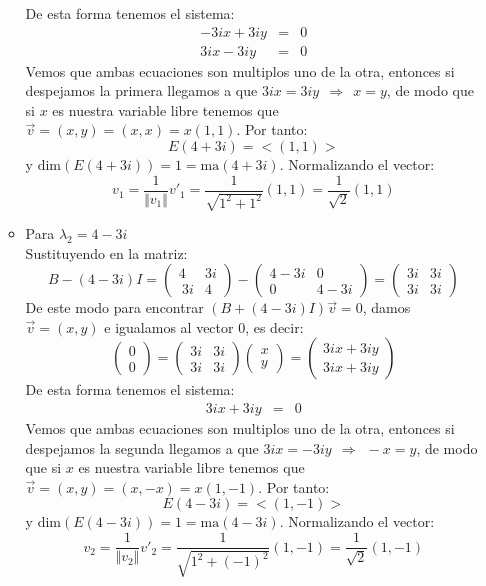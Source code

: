 \begin{itemize}
\begin{itemize}
        De esta forma tenemos el sistema:
        \begin{eqnarray*}
        -3ix+3iy&=&0\\
        3ix-3iy&=&0
        \end{eqnarray*}
        Vemos que ambas ecuaciones son multiplos uno de la otra, entonces si despejamos la primera llegamos a que $3ix=3iy~~\Longrightarrow~~x=y$, de modo que si $x$ es nuestra variable libre tenemos que $\vec{v}=(x,y)=(x,x)=x(1,1)$. Por tanto:
        \[E(4+3i)=<(1,1)>\]
        y $\text{dim}(E(4+3i))=1=\text{ma}(4+3i)$. 
        Normalizando el vector:
        \[v_1=\frac{1}{\Vert v_1\Vert}v'_1=\frac{1}{\sqrt{1^2+1^2}}(1,1)=\frac{1}{\sqrt{2}}(1,1)\]
        
        \item Para $\lambda_2=4-3i$\\
        Sustituyendo en la matriz:
        \[B-(4-3i)I=\begin{pmatrix}4&3i\\ \:3i&4\end{pmatrix}- \begin{pmatrix}4-3i&0\\ 0&4-3i\end{pmatrix}=\begin{pmatrix}3i&3i\\ 3i&3i\end{pmatrix}\]
        De este modo para encontrar $(B+(4-3i)I)\Vec{v}=0$, damos $\vec{v}=(x,y)$ e igualamos al vector 0, es decir:
        \[\begin{pmatrix}0\\0\end{pmatrix}=\begin{pmatrix}3i&3i\\ 3i&3i\end{pmatrix}\begin{pmatrix}x\\y\end{pmatrix}=\begin{pmatrix}3ix+3iy\\3ix+3iy\end{pmatrix}\]
        De esta forma tenemos el sistema:
        \begin{eqnarray*}
        3ix+3iy&=&0
        \end{eqnarray*}
        Vemos que ambas ecuaciones son multiplos uno de la otra, entonces si despejamos la segunda llegamos a que $3ix=-3iy~~\Longrightarrow~~-x=y$, de modo que si $x$ es nuestra variable libre tenemos que $\vec{v}=(x,y)=(x,-x)=x(1,-1)$. Por tanto:
        \[E(4-3i)=<(1,-1)>\]
        y $\text{dim}(E(4-3i))=1=\text{ma}(4-3i)$. 
        Normalizando el vector:
        \[v_2=\frac{1}{\Vert v_2\Vert}v'_2=\frac{1}{\sqrt{1^2+(-1)^2}}(1,-1)=\frac{1}{\sqrt{2}}(1,-1)\]
        

\end{itemize}
\end{itemize}
